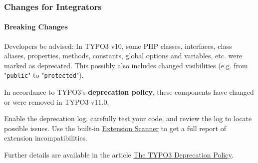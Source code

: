 %

\begin{frame}[fragile]
	\frametitle{Changes for Integrators}
	\framesubtitle{Breaking Changes}

	\small
		Developers be advised: In TYPO3 v10, some PHP classes, interfaces, class aliases,
		properties, methods, constants, global options and variables, etc. were marked
		as deprecated. This possibly also includes changed visibilities (e.g. from
		"\texttt{public}" to "\texttt{protected}").

		\vspace{0.2cm}

		In accordance to TYPO3's \textbf{deprecation policy}, these components have
		changed or were removed in TYPO3 v11.0.

		\vspace{0.2cm}

		Enable the deprecation log, carefully test your code, and review the log to
		locate possible issues. Use the built-in
		\href{https://docs.typo3.org/m/typo3/reference-coreapi/master/en-us/ApiOverview/ExtensionScanner/Index.html}{Extension Scanner}
		to get a full report of extension incompatibilities.

		\vspace{0.2cm}

		Further details are available in the article
		\href{https://typo3.org/article/typo3-deprecation-policy}{The TYPO3 Deprecation Policy}.

	\normalsize

\end{frame}

